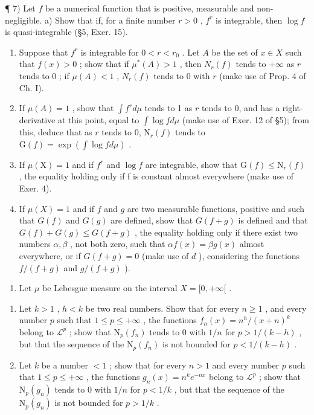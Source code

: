 ¶ 7) Let \(f\) be a numerical function that is positive, measurable and non-negligible. a) Show that if, for a finite number \(r > 0\) , \(f^r\) is integrable, then \(\log f\) is quasi-integrable (§5, Exer. 15).

\begin{enumerate}
\def\labelenumi{\alph{enumi})}
\setcounter{enumi}{1}
\item
  Suppose that \(f^r\) is integrable for \(0 < r < r_0\) . Let \(A\) be the set of \(x \in X\) such that \(f(x) > 0\) ; show that if \(\mu^*(A) > 1\) , then \(N_r(f)\) tends to \(+\infty\) as \(r\) tends to \(0\) ; if \(\mu(A) < 1\) , \(N_r(f)\) tends to \(0\) with \(r\) (make use of Prop. 4 of Ch. I).
\item
  If \(\mu(A) = 1\) , show that \(\int f^r d\mu\) tends to 1 as \(r\) tends to 0, and has a right-derivative at this point, equal to \(\int \log f d\mu\) (make use of Exer. 12 of §5); from this, deduce that as \(r\) tends to 0, \(\mathrm{N}_r(f)\) tends to \(\mathrm{G}(f) = \exp(\int \log f d\mu)\) .
\item
  If \(\mu(\mathrm{X})=1\) and if \(f^{r}\) and \(\log f\) are integrable, show that \(\mathrm{G}(f)\leqslant\mathrm{N}_{r}(f)\) , the equality holding only if f is constant almost everywhere (make use of Exer. 4).
\item
  If \(\mu(X) = 1\) and if \(f\) and \(g\) are two measurable functions, positive and such that \(G(f)\) and \(G(g)\) are defined, show that \(G(f + g)\) is defined and that \(G(f) + G(g) \leqslant G(f + g)\) , the equality holding only if there exist two numbers \(\alpha, \beta\) , not both zero, such that \(\alpha f(x) = \beta g(x)\) almost everywhere, or if \(G(f + g) = 0\) (make use of \(d\) ), considering the functions \(f/(f + g)\) and \(g/(f + g)\) ).
\end{enumerate}

\begin{enumerate}
\def\labelenumi{\arabic{enumi})}
\setcounter{enumi}{7}
\tightlist
\item
  Let \(\mu\) be Lebesgue measure on the interval \(X = [0, +\infty[\) .
\end{enumerate}

\begin{enumerate}
\def\labelenumi{\alph{enumi})}
\item
  Let \(k > 1\) , \(h < k\) be two real numbers. Show that for every \(n \geqslant 1\) , and every number \(p\) such that \(1 \leqslant p \leqslant +\infty\) , the functions \(f_n(x) = n^h / (x + n)^k\) belong to \(\mathcal{L}^p\) ; show that \(\mathrm{N}_p(f_n)\) tends to 0 with \(1/n\) for \(p > 1 / (k - h)\) , but that the sequence of the \(\mathrm{N}_p(f_n)\) is not bounded for \(p < 1 / (k - h)\) .
\item
  Let \(k\) be a number \(< 1\) ; show that for every \(n > 1\) and every number \(p\) such that \(1 \leqslant p \leqslant +\infty\) , the functions \(g_n(x) = n^k e^{-nx}\) belong to \(\mathcal{L}^p\) ; show that \(\mathrm{N}_p(g_n)\) tends to 0 with \(1/n\) for \(p < 1/k\) , but that the sequence of the \(\mathrm{N}_p(g_n)\) is not bounded for \(p > 1/k\) .
\end{enumerate}

